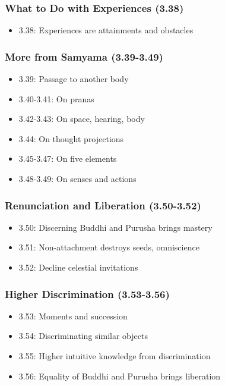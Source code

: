 \begin{frame}[fragile]\frametitle{What to Do with Experiences (3.38)}
\begin{itemize}  
\item 3.38: Experiences are attainments and obstacles
\end{itemize}
\end{frame}

\begin{frame}[fragile]\frametitle{More from Samyama (3.39-3.49)}
\begin{itemize}
\item 3.39: Passage to another body
\item 3.40-3.41: On pranas
\item 3.42-3.43: On space, hearing, body
\item 3.44: On thought projections
\item 3.45-3.47: On five elements
\item 3.48-3.49: On senses and actions
\end{itemize}
\end{frame}

\begin{frame}[fragile]\frametitle{Renunciation and Liberation (3.50-3.52)}
\begin{itemize}
\item 3.50: Discerning Buddhi and Purusha brings mastery
\item 3.51: Non-attachment destroys seeds, omniscience
\item 3.52: Decline celestial invitations  
\end{itemize}
\end{frame}

\begin{frame}[fragile]\frametitle{Higher Discrimination (3.53-3.56)}
\begin{itemize}
\item 3.53: Moments and succession
\item 3.54: Discriminating similar objects
\item 3.55: Higher intuitive knowledge from discrimination
\item 3.56: Equality of Buddhi and Purusha brings liberation
\end{itemize}
\end{frame}

